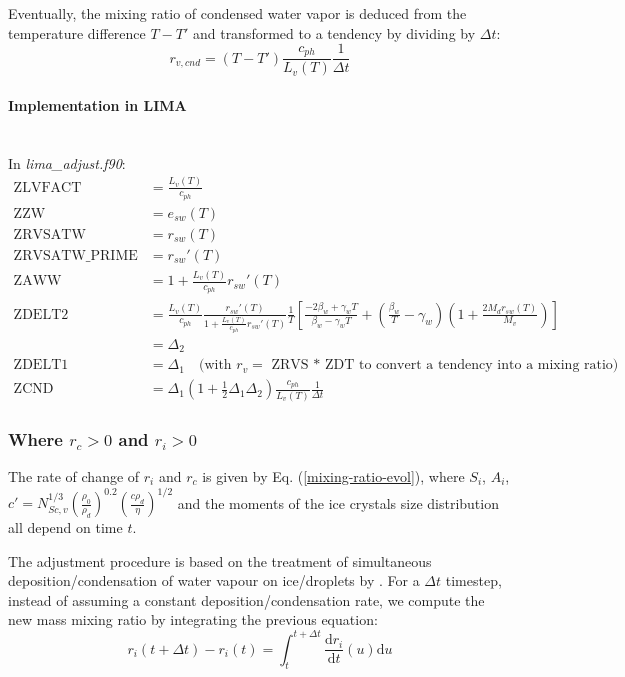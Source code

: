 Eventually, the mixing ratio of condensed water vapor is deduced from the temperature difference $T - T'$ and transformed to a tendency by dividing by $\Delta t$:
\begin{equation}
 r_{v,cnd} = (T - T') \frac{c_{ph}}{L_v(T)} \frac{1}{\Delta t}
\end{equation}

\paragraph{Implementation in LIMA}
~\\
In \emph{lima\_adjust.f90}:
\begin{align}
 \mathrm{ZLVFACT} &= \frac{L_v(T)}{c_{ph}} \\
 \mathrm{ZZW} &= e_{sw}(T) \\
 \mathrm{ZRVSATW} &= r_{sw}(T) \\
 \mathrm{ZRVSATW\_PRIME} &= r_{sw}'(T) \\
 \mathrm{ZAWW} &= 1 + \frac{L_v(T)}{c_{ph}} r_{sw}'(T) \\
 \mathrm{ZDELT2} &= \frac{L_v(T)}{c_{ph}} \frac{r_{sw}'(T)}{1 + \frac{L_v(T)}{c_{ph}} r_{sw}'(T)} \frac{1}{T} \left[ \frac{-2 \beta_w + \gamma_w T}{\beta_w - \gamma_w T} + \left( \frac{\beta_w}{T} - \gamma_w \right) \left( 1 + \frac{2 M_d r_{sw}(T)}{M_v} \right)\right] \\
 &= \Delta_2 \\
 \mathrm{ZDELT1} &= \Delta_1 \quad \text{(with $r_v = $ ZRVS * ZDT to convert a tendency into a mixing ratio)}\\
 \mathrm{ZCND} &= \Delta_1 \left( 1 + \frac{1}{2} \Delta_1 \Delta_2 \right) \frac{c_{ph}}{L_v(T)} \frac{1}{\Delta t}
\end{align}

\subsubsection{Where $r_c>0$ and $r_i>0$}

The rate of change of $r_i$ and $r_c$ is given by Eq. (\ref{mixing-ratio-evol}), where $S_i$, $A_i$, $c'=N_{Sc,v}^{1/3} \left(\frac{\rho_0}{\rho_d}\right)^{0.2} \left(\frac{c \rho_d}{\eta}\right)^{1/2} $ and the moments of the ice crystals size distribution all depend on time $t$.

The adjustment procedure is based on the treatment of simultaneous deposition/condensation of water vapour on ice/droplets by \citet{Reisin1996}. For a $\Delta t$ timestep, instead of assuming a constant deposition/condensation rate, we compute the new mass mixing ratio by integrating the previous equation:
\begin{equation}
 r_i(t + \Delta t) - r_i(t) = \int_t^{t + \Delta t} \frac{\mathrm{d}r_i}{\mathrm{d}t} (u) \mathrm{d}u
\end{equation}

